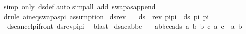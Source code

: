 \begin{isabellebody}
%
\isadelimproof
%
\endisadelimproof
%
\isatagproof
{}\isamarkupfalse%
{\isacharparenleft}{\kern0pt}simp\ only{\isacharcolon}{\kern0pt}\ ds{\isacharunderscore}{\kern0pt}def{\isacharparenright}{\kern0pt}\isanewline
{}\isamarkupfalse%
{\isacharparenleft}{\kern0pt}auto{\isacharparenright}{\kern0pt}\isanewline
{}\isamarkupfalse%
{\isacharparenleft}{\kern0pt}simp{\isacharunderscore}{\kern0pt}all\ add{\isacharcolon}{\kern0pt}\ swapas{\isacharunderscore}{\kern0pt}append{\isacharparenright}{\kern0pt}\isanewline
{}\isamarkupfalse%
{\isacharparenleft}{\kern0pt}drule\ a{\isacharunderscore}{\kern0pt}ineq{\isacharunderscore}{\kern0pt}swapas{\isacharunderscore}{\kern0pt}pi{\isacharcomma}{\kern0pt}\ assumption{\isacharparenright}{\kern0pt}{\isacharplus}{\kern0pt}\isanewline
{}\isamarkupfalse%
%
\endisatagproof
{\isafoldproof}%
%
\isadelimproof
\isanewline
%
\endisadelimproof
\isanewline
{}\isamarkupfalse%
\ ds{\isacharunderscore}{\kern0pt}rev{\isacharcolon}{\kern0pt}\ \isanewline
\ \ {\isachardoublequoteopen}ds\ {\isacharbrackleft}{\kern0pt}{\isacharbrackright}{\kern0pt}\ {\isacharparenleft}{\kern0pt}{\isacharparenleft}{\kern0pt}rev\ pi{}{\isacharparenright}{\kern0pt}{\isacharat}{\kern0pt}pi{}{\isacharparenright}{\kern0pt}\ {\isacharequal}{\kern0pt}\ ds\ pi{}\ pi{}{\isachardoublequoteclose}\isanewline
%
\isadelimproof
\ \ %
\endisadelimproof
%
\isatagproof
{}\isamarkupfalse%
\ ds{\isacharunderscore}{\kern0pt}cancel{\isacharunderscore}{\kern0pt}pi{\isacharunderscore}{\kern0pt}front\ ds{\isacharunderscore}{\kern0pt}rev{\isacharunderscore}{\kern0pt}pi{\isacharunderscore}{\kern0pt}pi\ \isamarkupfalse%
\ blast%
\endisatagproof
{\isafoldproof}%
%
\isadelimproof
\isanewline
%
\endisadelimproof
\isanewline
{}\isamarkupfalse%
\ ds{\isacharunderscore}{\kern0pt}acabbc{\isacharcolon}{\kern0pt}\ \isanewline
\ \ {\isachardoublequoteopen}{\isasymlbrakk}a{\isasymnoteq}b{\isacharsemicolon}{\kern0pt}b{\isasymnoteq}c{\isacharsemicolon}{\kern0pt}c{\isasymnoteq}a{\isasymrbrakk}{\isasymLongrightarrow}ds\ {\isacharbrackleft}{\kern0pt}{\isacharparenleft}{\kern0pt}a{\isacharcomma}{\kern0pt}\ b{\isacharparenright}{\kern0pt}{\isacharcomma}{\kern0pt}\ {\isacharparenleft}{\kern0pt}b{\isacharcomma}{\kern0pt}\ c{\isacharparenright}{\kern0pt}{\isacharbrackright}{\kern0pt}\ {\isacharbrackleft}{\kern0pt}{\isacharparenleft}{\kern0pt}a{\isacharcomma}{\kern0pt}\ c{\isacharparenright}{\kern0pt}{\isacharbrackright}{\kern0pt}\ {\isacharequal}{\kern0pt}\ {\isacharbraceleft}{\kern0pt}a{\isacharcomma}{\kern0pt}\ b{\isacharbraceright}{\kern0pt}{\isachardoublequoteclose}\isanewline

\end{isabellebody}

